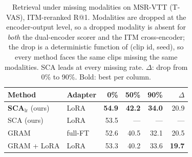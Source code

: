 \begin{table}[t]
\centering
\caption{Retrieval under missing modalities on MSR-VTT (T-VAS), ITM-reranked R@1.
Modalities are dropped at the encoder-output level, so a dropped modality is absent for
\emph{both} the dual-encoder scorer and the ITM cross-encoder; the drop is a
deterministic function of (clip id, seed), so every method faces the same clips missing
the same modalities. SCA leads at every missing rate. $\Delta$: drop from 0\% to 90\%.
Bold: best per column.}
\label{tab:missing}
\small
\begin{tabular}{llrrrr}
\toprule
Method & Adapter & 0\% & 50\% & 90\% & $\Delta$ \\
\midrule
\textbf{SCA}$_{\text{lr}}$ (ours) & LoRA & \textbf{54.9} & \textbf{42.2} & \textbf{34.0} & 20.9 \\
SCA (ours) & LoRA & 53.5 & \phantom{0}--- & \phantom{0}--- & --- \\
\midrule
GRAM & full-FT & 52.6 & 40.5 & 32.1 & 20.5 \\
GRAM + LoRA & LoRA & 53.3 & 40.2 & 33.6 & \textbf{19.7} \\
\bottomrule
\end{tabular}
\end{table}
